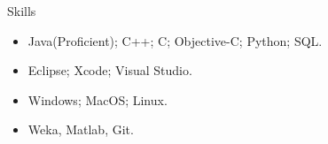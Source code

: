 \documentclass[]{mcdowellcv}
\begin{document}
	
	\begin{cvsection}{Skills}
		\begin{cvsubsection}{}{}{}	
			\begin{itemize}
				\item Java(Proficient); C++; C; Objective-C; Python; SQL.  
				\item Eclipse; Xcode; Visual Studio.
				\item Windows; MacOS; Linux. 
				\item Weka, Matlab, Git.
			\end{itemize}
		\end{cvsubsection}
	\end{cvsection}
	
\end{document}
